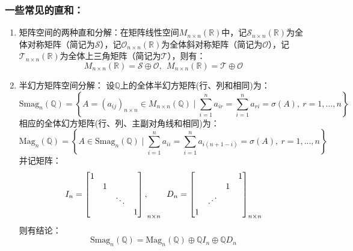 \documentclass[zihao=-4,UTF8]{report}
\theoremstyle{mystyle} %
\begin{document}
\subsubsection{一些常见的直和：}
\begin{enumerate}
    \item 矩阵空间的两种直和分解：在矩阵线性空间$M_{n\times n}(\mathbb{R})$中，记$\mathcal{S} _{n\times n}(\mathbb{R})$为全体对称矩阵（简记为$\mathcal{S}$），记$\mathcal{O}_{n\times n}(\mathbb{R})$为全体斜对称矩阵（简记为$\mathcal{O}$），记$\mathcal{T}_{n\times n}(\mathbb{R})$为全体上三角矩阵（简记为$\mathcal{T}$），则有：
    \begin{equation*}
        M_{n\times n}(\mathbb{R}) =\mathcal{S}\oplus  \mathcal{O},\ \ M_{n\times n}(\mathbb{R}) =\mathcal{T}\oplus  \mathcal{O}
    \end{equation*}
    \item 半幻方矩阵空间分解：
    设$\mathbb{Q}$上的全体半幻方矩阵(行、列和相同)为：\begin{equation*}
        \text{Smag}_n(\mathbb{Q}) = \left\{A = (a_{ij})_{n\times n} \in M_{n\times n}(\mathbb{Q}) \mid \sum_{i = 1}^{n}a_{ir} = \sum_{i=1}^{n}a_{ri} = \sigma(A),\ r = 1,...,n\right\}
    \end{equation*}
    相应的全体幻方矩阵(行、列、主副对角线和相同)为：
    \begin{equation*}
        \text{Mag}_n(\mathbb{Q}) = \left\{A \in \text{Smag}_n(\mathbb{Q}) \mid \sum_{i=1}^{n}a_{ii}=  \sum_{i = 1}^{n}a_{i(n+1-i)} = \sigma(A),\ r = 1,...,n\right\}
    \end{equation*}
并记矩阵：
\begin{equation*}
    I_n = 
    {\begin{bmatrix}  
        1 &  &  &  \\  
         & 1 &  &  \\  
         &  & \ddots & \\  
         &  &  & 1 
    \end{bmatrix},}_{n\times n}\ \ 
    D_n = 
    \begin{bmatrix}  
        &&&1\\
        &&1&\\
        &\reflectbox{$\ddots$} &&\\
        1&&&
    \end{bmatrix}_{n\times n}
\end{equation*}
则有结论：
\begin{equation*}
    \text{Smag}_n(\mathbb{Q}) = \text{Mag}_n(\mathbb{Q}) \oplus \mathbb{Q}I_n \oplus  \mathbb{Q}D_n
\end{equation*}


\end{enumerate}
\end{document}
